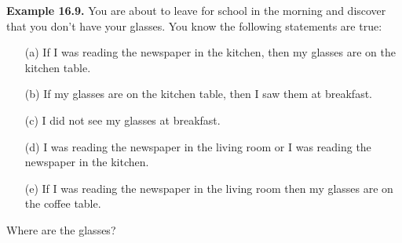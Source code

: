 \documentclass[aspectratio=169]{beamer}
\begin{document}
\begin{frame}[plain]{}

 {\bf Example 16.9.} You are about to leave for school in the morning and discover 
 that you don’t have your glasses. You know the following statements
   are true:
   
   \begin{itemize}
    \item[(a)] If I was reading the newspaper in the kitchen, 
    then my glasses
    are on the kitchen table.
   \item[(b)] If my glasses are on the kitchen table, then I saw them at
     breakfast.
   \item[(c)] I did not see my glasses at breakfast.
   \item[(d)] I was reading the newspaper in the living room or I was reading
       the newspaper in the kitchen.
   \item[(e)] If I was reading the newspaper in the living room then my
    glasses are on the coffee table.
  \end{itemize}
  Where are the glasses?
  
 \end{frame}
 
\end{document}
